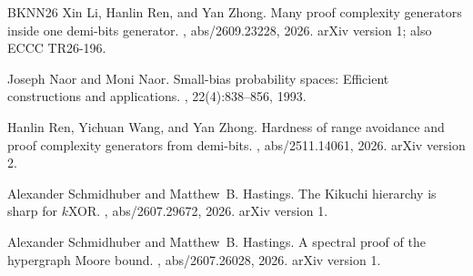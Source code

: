 \documentclass[letterpaper,11pt]{article}
\theoremstyle{definition}
\begin{document}
\begin{thebibliography}{BKNN{\etalchar{+}}26}
Xin Li, Hanlin Ren, and Yan Zhong.
\newblock Many proof complexity generators inside one demi-bits generator.
, abs/2609.23228, 2026.
\newblock arXiv version 1; also ECCC TR26-196.

Joseph Naor and Moni Naor.
\newblock Small-bias probability spaces: Efficient constructions and
  applications.
, 22(4):838--856, 1993.

Hanlin Ren, Yichuan Wang, and Yan Zhong.
\newblock Hardness of range avoidance and proof complexity generators from
  demi-bits.
, abs/2511.14061, 2026.
\newblock arXiv version 2.

Alexander Schmidhuber and Matthew~B. Hastings.
\newblock The {Kikuchi} hierarchy is sharp for {$k$XOR}.
, abs/2607.29672, 2026.
\newblock arXiv version 1.

Alexander Schmidhuber and Matthew~B. Hastings.
\newblock A spectral proof of the hypergraph {Moore} bound.
, abs/2607.26028, 2026.
\newblock arXiv version 1.

\end{thebibliography}
\end{document}
